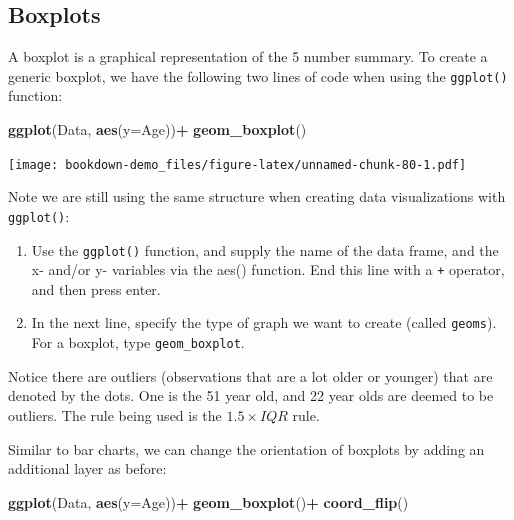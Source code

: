 \documentclass[
]{book}
\newenvironment{Shaded}{\begin{snugshade}}{\end{snugshade}}
\newcommand{\AttributeTok}[1]{\textcolor[rgb]{0.13,0.29,0.53}{#1}}
\newcommand{\FunctionTok}[1]{\textcolor[rgb]{0.13,0.29,0.53}{\textbf{#1}}}
\newcommand{\NormalTok}[1]{#1}
\newcommand{\SpecialCharTok}[1]{\textcolor[rgb]{0.81,0.36,0.00}{\textbf{#1}}}
\begin{document}
\hypertarget{boxplots}{%
\subsection{Boxplots}\label{boxplots}}

A boxplot is a graphical representation of the 5 number summary. To create a generic boxplot, we have the following two lines of code when using the \texttt{ggplot()} function:

\begin{Shaded}
\begin{Highlighting}[]
\FunctionTok{ggplot}\NormalTok{(Data, }\FunctionTok{aes}\NormalTok{(}\AttributeTok{y=}\NormalTok{Age))}\SpecialCharTok{+}
  \FunctionTok{geom\_boxplot}\NormalTok{()}
\end{Highlighting}
\end{Shaded}

\texttt{[image: bookdown-demo\_files/figure-latex/unnamed-chunk-80-1.pdf]}

Note we are still using the same structure when creating data visualizations with \texttt{ggplot()}:

\begin{enumerate}
\def\labelenumi{\arabic{enumi}.}
\item
  Use the \texttt{ggplot()} function, and supply the name of the data frame, and the x- and/or y- variables via the aes() function. End this line with a \texttt{+} operator, and then press enter.
\item
  In the next line, specify the type of graph we want to create (called \texttt{geoms}). For a boxplot, type \texttt{geom\_boxplot}.
\end{enumerate}

Notice there are outliers (observations that are a lot older or younger) that are denoted by the dots. One is the 51 year old, and 22 year olds are deemed to be outliers. The rule being used is the \(1.5 \times IQR\) rule.

Similar to bar charts, we can change the orientation of boxplots by adding an additional layer as before:

\begin{Shaded}
\begin{Highlighting}[]
\FunctionTok{ggplot}\NormalTok{(Data, }\FunctionTok{aes}\NormalTok{(}\AttributeTok{y=}\NormalTok{Age))}\SpecialCharTok{+}
  \FunctionTok{geom\_boxplot}\NormalTok{()}\SpecialCharTok{+}
  \FunctionTok{coord\_flip}\NormalTok{()}
\end{Highlighting}
\end{Shaded}
\end{document}
